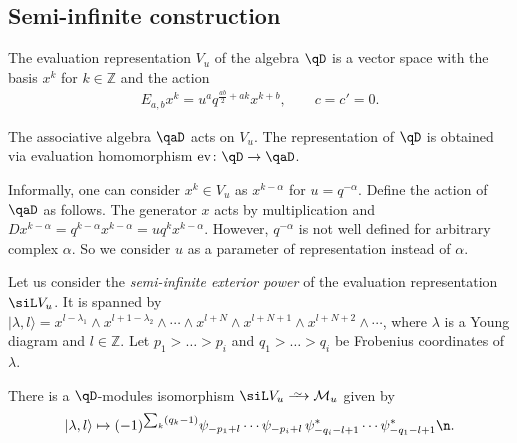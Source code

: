 \subsection{Semi-infinite construction}

\begin{Definition} \label{eq: sec3 eval def}The evaluation representation $V_{u}$ of the algebra $\qD$ is a vector space with the basis $x^{k}$ for $k \in \mathbb{Z}$ and the action
\begin{gather*}
E_{a,b} x^{k} = u^a q^{\frac{ab}{2} + ak} x^{k+b}, \qquad c=c'=0.
\end{gather*}
\end{Definition}

\begin{Remark}The associative algebra $\qaD$ acts on $V_u$. The representation of $\qD$ is obtained via evaluation homomorphism $\mathrm{ev}\colon \qD \rightarrow \qaD$.
\end{Remark}

\begin{Remark}Informally, one can consider $x^k \in V_u$ as $x^{k-\alpha}$ for $u=q^{-\alpha}$. Define the action of $\qaD$ as follows. The generator $x$ acts by multiplication and $D x^{k-\alpha} = q^{k-\alpha} x^{k-\alpha} = u q^k x^{k-\alpha}$. However, $q^{-\alpha}$ is not well defined for arbitrary complex $\alpha$. So we consider $u$ as a parameter of representation instead of $\alpha$.
\end{Remark}

Let us consider the \emph{semi-infinite exterior power} of the evaluation representation $\siL V_{u}$. It is spanned by $| \lambda,l \rangle = x^{l-\lambda_1} \wedge x^{l+1-\lambda_2} \wedge \cdots \wedge x^{l+N} \wedge x^{l+N+1} \wedge x^{l+N+2} \wedge \cdots$, where $\lambda$ is a Young diagram and $l \in \mathbb{Z}$. Let $p_1 > \dots> p_i$ and $q_1> \dots> q_i$ be Frobenius coordinates of $\lambda$.

\begin{Proposition} \label{Prop:SemiInf-Fermi}
There is a $\qD$-modules isomorphism $\siL V_{u} \xrightarrow{
\,\smash{\raisebox{-0.65ex}{\ensuremath{\scriptstyle\sim}}}\,} \mathcal{M}_{u}$ given by
\begin{gather}\label{eq:lambda l}
| \lambda,l \rangle \mapsto (-1)^{\sum_k (q_k-1)} \psi_{-p_1+l} \cdots \psi_{-p_i+l} \, \psi_{-q_i-l+1}^* \cdots \psi_{-q_1-l+1}^* \n.
\end{gather}
\end{Proposition}

